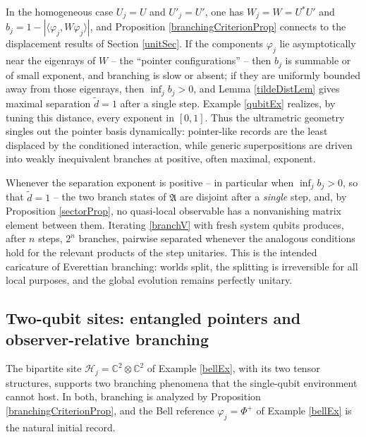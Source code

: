 \documentclass[twoside,11pt,letter]{article}
\def\bC{\mathbb{C}}
\def\cH{{\mathcal{H}}}
\theoremstyle{definition}
\theoremstyle{definition}
\theoremstyle{plain}
\begin{document}
In the homogeneous case $U_j=U$ and $U'_j=U'$, one has $W_j=W=U^\ast U'$ and $b_j=1-|\langle\varphi_j,W\varphi_j\rangle|$, and Proposition \ref{branchingCriterionProp} connects to the displacement results of Section \ref{unitSec}. If the components $\varphi_j$ lie asymptotically near the eigenrays of $W$ -- the ``pointer configurations'' -- then $b_j$ is summable or of small exponent, and branching is slow or absent; if they are uniformly bounded away from those eigenrays, then $\inf_j b_j>0$, and Lemma \ref{tildeDistLem} gives maximal separation $\tilde d=1$ after a single step. Example \ref{qubitEx} realizes, by tuning this distance, every exponent in $[0,1]$. Thus the ultrametric geometry singles out the pointer basis dynamically: pointer-like records are the least displaced by the conditioned interaction, while generic superpositions are driven into weakly inequivalent branches at positive, often maximal, exponent.

Whenever the separation exponent is positive -- in particular when $\inf_j b_j>0$, so that $\tilde d=1$ -- the two branch states of $\mathfrak{A}$ are disjoint after a \emph{single} step, and, by Proposition \ref{sectorProp}, no quasi-local observable has a nonvanishing matrix element between them. Iterating \eqref{branchV} with fresh system qubits produces, after $n$ steps, $2^n$ branches, pairwise separated whenever the analogous conditions hold for the relevant products of the step unitaries. This is the intended caricature of Everettian branching: worlds split, the splitting is irreversible for all local purposes, and the global evolution remains perfectly unitary.

\subsection{Two-qubit sites: entangled pointers and observer-relative branching}\label{twoQubitSubsec}

The bipartite site $\cH_j=\bC^2\otimes\bC^2$ of Example \ref{bellEx}, with its two tensor structures, supports two branching phenomena that the single-qubit environment cannot host. In both, branching is analyzed by Proposition \ref{branchingCriterionProp}, and the Bell reference $\varphi_j=\Phi^+$ of Example \ref{bellEx} is the natural initial record.
\end{document}

